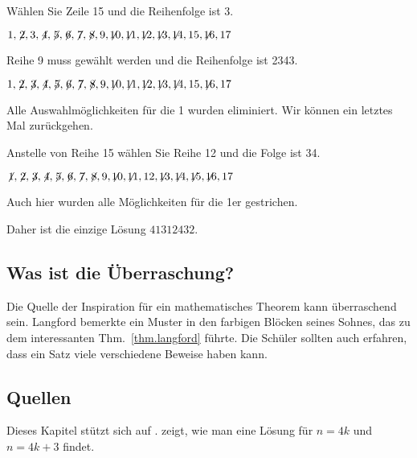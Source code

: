 \noindent Wählen Sie Zeile 15 und die Reihenfolge ist \textvisiblespace{}3.

$1,\not\! 2,3,\not\! 4,\not\! 5,\not\! 6,\not\! 7,\not\! 8,9,\not\!\! 10,\not\!\! 11,\not\!\! 12,\not\!\! 13,\not\!\! 14,15,\not\!\! 16,17$

\noindent Reihe 9 muss gewählt werden und die Reihenfolge ist 2{}34{}3.

$1,\not\! 2,\not\! 3,\not\! 4,\not\! 5,\not\! 6,\not\! 7,\not\! 8,9,\not\!\! 10,\not\!\! 11,\not\!\! 12,\not\!\! 13,\not\!\! 14,15,\not\!\! 16,17$

\noindent Alle Auswahlmöglichkeiten für die 1 wurden eliminiert. Wir können ein letztes Mal zurückgehen. 

\smallskip

\noindent Anstelle von Reihe 15 wählen Sie Reihe 12 und die Folge ist 3{}4\textvisiblespace {}.

$\not\! 1,\not\! 2,\not\! 3,\not\! 4,\not\! 5,\not\! 6,\not\! 7,\not\! 8,9,\not\!\! 10,\not\!\! 11,12,\not\!\! 13,\not\!\! 14,\not\!\! 15,\not\!\! 16,17$

\noindent Auch hier wurden alle Möglichkeiten für die 1er gestrichen.

\medskip

\noindent Daher ist die einzige Lösung $41312432$.

\subsection*{Was ist die Überraschung?}

Die Quelle der Inspiration für ein mathematisches Theorem kann überraschend sein. Langford bemerkte ein Muster in den farbigen Blöcken seines Sohnes, das zu dem interessanten Thm.~\ref{thm.langford} führte. Die Schüler sollten auch erfahren, dass ein Satz viele verschiedene Beweise haben kann.

\subsection*{Quellen}
Dieses Kapitel stützt sich auf \cite{miller}. \cite{davies} zeigt, wie man eine Lösung für $n=4k$ und $n=4k+3$ findet.
